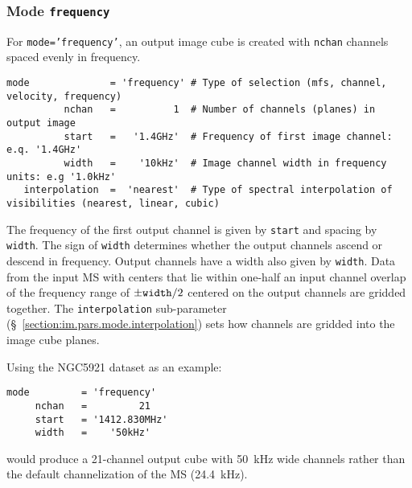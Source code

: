 \subsubsection{Mode {\tt frequency} }
\label{section:im.pars.mode.frequency}

For {\tt mode='frequency'}, an output image cube is created
with {\tt nchan} channels spaced evenly in frequency.
\small
\begin{verbatim}
mode              = 'frequency' # Type of selection (mfs, channel, velocity, frequency)
          nchan   =          1  # Number of channels (planes) in output image
          start   =   '1.4GHz'  # Frequency of first image channel: e.q. '1.4GHz'
          width   =    '10kHz'  # Image channel width in frequency units: e.g '1.0kHz'
   interpolation  =  'nearest'  # Type of spectral interpolation of visibilities (nearest, linear, cubic)
\end{verbatim}
\normalsize
The frequency of the first output channel is given by {\tt start}
and spacing by {\tt width}.  The sign of {\tt width}
determines whether the output channels ascend or descend in
frequency.  Output channels have a width also given by {\tt width}.
Data from the input MS with centers that lie within one-half an input
channel overlap of the frequency range of $\pm{\tt width}/2$ centered
on the output channels are gridded together.  
The {\tt interpolation} sub-parameter
(\S~\ref{section:im.pars.mode.interpolation}) sets how channels are
gridded into the image cube planes.

Using the NGC5921 dataset as an example:
\small
\begin{verbatim}
mode         = 'frequency'       
     nchan   =         21        
     start   = '1412.830MHz'     
     width   =    '50kHz'        

\end{verbatim}
\normalsize
would produce a 21-channel output cube with 50~kHz wide channels
rather than the default channelization of the MS (24.4~kHz).


